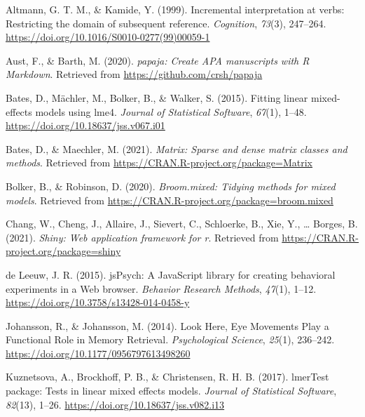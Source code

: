 \documentclass[
  english,
  man,floatsintext]{apa6}
\newlength{\cslhangindent}
\newlength{\cslentryspacingunit} %
\newenvironment{CSLReferences}[2] %
 {%
  \setlength{\parindent}{0pt}
  \ifodd #1
  \let\oldpar\par
  \def\par{\hangindent=\cslhangindent\oldpar}
  \fi
  \setlength{\parskip}{#2\cslentryspacingunit}
 }%
 {}
\begin{document}
\begingroup
\setlength{\parindent}{-0.5in}
\setlength{\leftskip}{0.5in}

\hypertarget{refs}{}
\begin{CSLReferences}{1}{0}
\leavevmode{}%
Altmann, G. T. M., \& Kamide, Y. (1999). Incremental interpretation at verbs: Restricting the domain of subsequent reference. \emph{Cognition}, \emph{73}(3), 247--264. \url{https://doi.org/10.1016/S0010-0277(99)00059-1}

\leavevmode{}%
Aust, F., \& Barth, M. (2020). \emph{{papaja}: {Create} {APA} manuscripts with {R Markdown}}. Retrieved from \url{https://github.com/crsh/papaja}

\leavevmode{}%
Bates, D., Mächler, M., Bolker, B., \& Walker, S. (2015). Fitting linear mixed-effects models using {lme4}. \emph{Journal of Statistical Software}, \emph{67}(1), 1--48. \url{https://doi.org/10.18637/jss.v067.i01}

\leavevmode{}%
Bates, D., \& Maechler, M. (2021). \emph{Matrix: Sparse and dense matrix classes and methods}. Retrieved from \url{https://CRAN.R-project.org/package=Matrix}

\leavevmode{}%
Bolker, B., \& Robinson, D. (2020). \emph{Broom.mixed: Tidying methods for mixed models}. Retrieved from \url{https://CRAN.R-project.org/package=broom.mixed}

\leavevmode{}%
Chang, W., Cheng, J., Allaire, J., Sievert, C., Schloerke, B., Xie, Y., \ldots{} Borges, B. (2021). \emph{Shiny: Web application framework for r}. Retrieved from \url{https://CRAN.R-project.org/package=shiny}

\leavevmode{}%
de Leeuw, J. R. (2015). {jsPsych}: {A JavaScript} library for creating behavioral experiments in a {Web} browser. \emph{Behavior Research Methods}, \emph{47}(1), 1--12. \url{https://doi.org/10.3758/s13428-014-0458-y}

\leavevmode{}%
Johansson, R., \& Johansson, M. (2014). Look {Here}, {Eye Movements Play} a {Functional Role} in {Memory Retrieval}. \emph{Psychological Science}, \emph{25}(1), 236--242. \url{https://doi.org/10.1177/0956797613498260}

\leavevmode{}%
Kuznetsova, A., Brockhoff, P. B., \& Christensen, R. H. B. (2017). {lmerTest} package: Tests in linear mixed effects models. \emph{Journal of Statistical Software}, \emph{82}(13), 1--26. \url{https://doi.org/10.18637/jss.v082.i13}


\end{CSLReferences}
\end{document}
